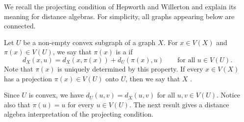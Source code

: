 \documentclass[a4paper,leqno]{amsart}
\begin{document}
We recall the projecting condition of Hepworth and Willerton
\cite[Definitions~6.2 and 6.3]{HW17} and explain its meaning for distance algebras.  For simplicity, all graphs appearing below are  connected.

\begin{dfn}\label{def:projecting-subgraph}
Let $U$ be a non-empty convex subgraph of a graph $X$.  
For $x\in V(X)$ and $\pi(x)\in V(U)$, we say that $\pi(x)$ is a  if 
\[
d_X(x,u)
=d_X(x,\pi(x))+d_U(\pi(x),u)
\qquad\text{for all $u\in V(U)$.}
\]
Note that $\pi(x)$ is uniquely determined by this property.
If every $x\in V(X)$ has a projection $\pi(x)\in V(U)$ onto $U$, then we say that $X$ .
\end{dfn}

Since $U$ is convex, we have $d_U(u,v)=d_X(u,v)$ for all
$u,v\in V(U)$.  Notice also that $\pi(u)=u$ for every $u\in V(U)$.
The next result gives a distance algebra interpretation of the
projecting condition.
\end{document}
